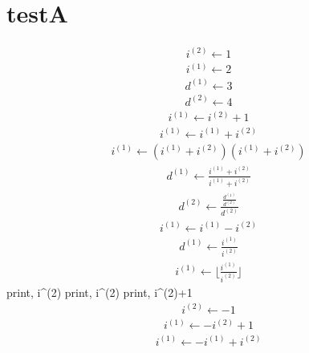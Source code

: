 \documentclass[a4paper,fleqn]{ltjsarticle}
\begin{document}
\section{testA}
  \begin{align}
  i^{(2)} \leftarrow 1
  \end{align}
  \begin{align}
  i^{(1)} \leftarrow 2
  \end{align}
  \begin{align}
  d^{(1)} \leftarrow 3
  \end{align}
  \begin{align}
  d^{(2)} \leftarrow 4
  \end{align}
  \begin{align}
  i^{(1)} \leftarrow i^{(2)}+1
  \end{align}
  \begin{align}
  i^{(1)} \leftarrow i^{(1)}+i^{(2)}
  \end{align}
  \begin{align}
  i^{(1)} \leftarrow \left(i^{(1)}+i^{(2)}\right) \left(i^{(1)}+i^{(2)}\right)
  \end{align}
  \begin{align}
  d^{(1)} \leftarrow \frac{\displaystyle i^{(1)}+i^{(2)}}{\displaystyle i^{(1)}+i^{(2)}}
  \end{align}
  \begin{align}
  d^{(2)} \leftarrow \frac{\displaystyle \frac{\displaystyle d^{(1)}}{\displaystyle d^{(2)}}}{\displaystyle d^{(2)}}
  \end{align}
  \begin{align}
  i^{(1)} \leftarrow i^{(1)}-i^{(2)}
  \end{align}
  \begin{align}
  d^{(1)} \leftarrow \frac{\displaystyle i^{(1)}}{\displaystyle i^{(2)}}
  \end{align}
  \begin{align}
  i^{(1)} \leftarrow \lfloor \frac{\displaystyle i^{(1)}}{\displaystyle i^{(2)}}\rfloor
  \end{align}
  print, i^{(2)}
  print, i^{(2)}
  print, i^{(2)}+1
  \begin{align}
  i^{(2)} \leftarrow -1
  \end{align}
  \begin{align}
  i^{(1)} \leftarrow -i^{(2)}+1
  \end{align}
  \begin{align}
  i^{(1)} \leftarrow -i^{(1)}+i^{(2)}
  \end{align}
\end{document}
